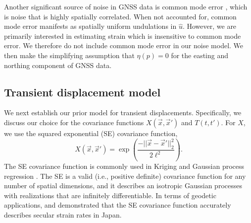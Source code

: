 \documentclass[10pt,letter]{article}
\begin{document}
Another significant source of noise in GNSS data is common mode error \citep[e.g.,][]{Wdowinski1997,Dong2006}, which is noise that is highly spatially correlated. When not accounted for, common mode error manifests as spatially uniform undulations in $\hat{u}$. However, we are primarily interested in estimating strain which is insensitive to common mode error. We therefore do not include common mode error in our noise model. We then make the simplifying assumption that $\eta(p) = 0$ for the easting and northing component of GNSS data.            

\subsection{Transient displacement model}\label{sec:SignalModel}
We next establish our prior model for transient displacements. Specifically, we discuss our choice for the covariance functions $X(\vec{x},\vec{x}')$ and $T(t,t')$. For $X$, we use the squared exponential (SE) covariance function,
\begin{equation}\label{eq:SE}
X(\vec{x},\vec{x}') = \exp\left(\frac{-||\vec{x} - \vec{x}'||_2^2}{2 \ell^2}\right).
\end{equation}
The SE covariance function is commonly used in Kriging \citep[e.g,][]{Cressie1992} and Gaussian process regression \citep[e.g.,][]{Rasmussen2006}.  The SE is a valid (i.e., positive definite) covariance function for any number of spatial dimensions, and it describes an isotropic Gaussian processes with realizations that are infinitely differentiable. In terms of geodetic applications, \citet{Kato1998} and \cite{El-Fiky1999} demonstrated that the SE covariance function accurately describes secular strain rates in Japan.  
\end{document}
